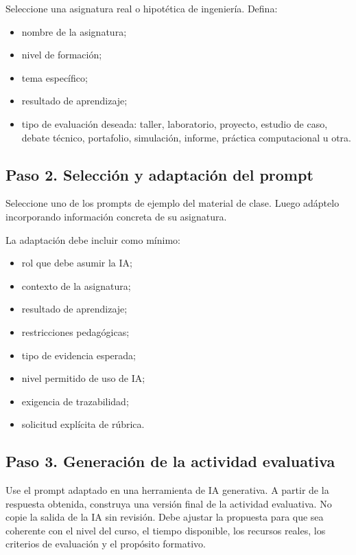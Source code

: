 \documentclass[12pt,letterpaper]{article}
\begin{document}
Seleccione una asignatura real o hipotética de ingeniería. Defina:

\begin{itemize}
  \item nombre de la asignatura;
  \item nivel de formación;
  \item tema específico;
  \item resultado de aprendizaje;
  \item tipo de evaluación deseada: taller, laboratorio, proyecto,
    estudio de caso, debate técnico, portafolio, simulación, informe,
    práctica computacional u otra.
\end{itemize}

\subsection*{Paso 2. Selección y adaptación del prompt}

Seleccione uno de los prompts de ejemplo del material de clase. Luego
adáptelo incorporando información concreta de su asignatura.

La adaptación debe incluir como mínimo:

\begin{itemize}
  \item rol que debe asumir la IA;
  \item contexto de la asignatura;
  \item resultado de aprendizaje;
  \item restricciones pedagógicas;
  \item tipo de evidencia esperada;
  \item nivel permitido de uso de IA;
  \item exigencia de trazabilidad;
  \item solicitud explícita de rúbrica.
\end{itemize}

\subsection*{Paso 3. Generación de la actividad evaluativa}

Use el prompt adaptado en una herramienta de IA generativa. A partir
de la respuesta obtenida, construya una versión final de la actividad
evaluativa. No copie la salida de la IA sin revisión. Debe ajustar la
propuesta para que sea coherente con el nivel del curso, el tiempo
disponible, los recursos reales, los criterios de evaluación y el
propósito formativo.
\end{document}
